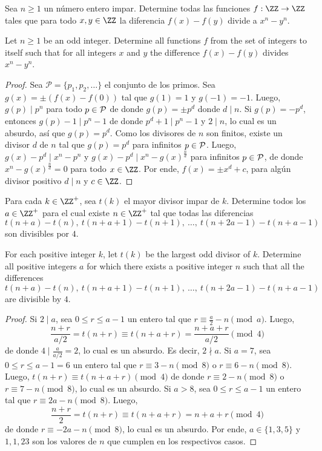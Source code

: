 
\begin{probEB}[ISL 2011/N3]
  Sea $n\ge 1$ un número entero impar. Determine todas las funciones
  $f:\ZZ\to\ZZ$ tales que para todo $x,y\in\ZZ$ la diferencia $f(x)-f(y)$ divide
  a $x^n-y^n$.
  \begin{hint}
    Let $n\ge 1$ be an odd integer. Determine all functions $f$ from the set of
    integers to itself such that for all integers $x$ and $y$ the difference
    $f(x)-f(y)$ divides $x^n-y^n$.
  \end{hint}
\end{probEB}

\begin{proof}
  Sea $\mathcal P=\{p_1,p_2,\dots\}$ el conjunto de los primos. Sea
  $g(x)=\pm(f(x)-f(0))$ tal que $g(1)=1$ y $g(-1)=-1$. Luego, $g(p)\mid p^n$
  para todo $p\in\cal P$ de donde $g(p)=\pm p^d$ donde $d\mid n$. Si
  $g(p)=-p^d$, entonces $g(p)-1\mid p^n-1$ de donde $p^d+1\mid p^n-1$ y
  $2\mid n$, lo cual es un absurdo, así que $g(p)=p^d$. Como los divisores de
  $n$ son finitos, existe un divisor $d$ de $n$ tal que $g(p)=p^d$ para
  infinitos $p\in\cal P$. Luego, $g(x)-p^d\mid x^n-p^n$ y
  $g(x)-p^d\mid x^n-g(x)^\frac{n}{d}$ para infinitos $p\in\cal P$, de donde
  $x^n-g(x)^\frac{n}{d}=0$ para todo $x\in\ZZ$. Por ende, $f(x)=\pm x^d+c$, para
  algún divisor positivo $d\mid n$ y $c\in\ZZ$.
\end{proof}

\begin{probMB}[ISL 2011/N4]
  Para cada $k\in\ZZ^+$, sea $t(k)$ el mayor divisor impar de $k$. Determine
  todos los $a\in\ZZ^+$ para el cual existe $n\in\ZZ^+$ tal que todas las
  diferencias
  \[t(n+a)-t(n),\ t(n+a+1)-t(n+1),\ \dots,\ t(n+2a-1)-t(n+a-1)\]
  son divisibles por $4$.
  \begin{hint}
    For each positive integer $k$, let $t(k)$ be the largest odd divisor of $k$.
    Determine all positive integers $a$ for which there exists a positive
    integer $n$ such that all the differences
    \[t(n+a)-t(n),\ t(n+a+1)-t(n+1),\ \dots,\ t(n+2a-1)-t(n+a-1)\]
    are divisible by $4$.
  \end{hint}
\end{probMB}

\begin{proof}
  Si $2\mid a$, sea $0\le r\le a-1$ un entero tal que
  $r\equiv\frac a2-n\pmod a$. Luego,
  \[\frac{n+r}{a/2}=t(n+r)\equiv t(n+a+r)=\frac{n+a+r}{a/2}\pmod 4\]
  de donde $4\mid\frac{a}{a/2}=2$, lo cual es un absurdo. Es decir, $2\nmid a$.
  Si $a=7$, sea $0\le r\le a-1=6$ un entero tal que $r\equiv 3-n\pmod 8$ o
  $r\equiv 6-n\pmod 8$. Luego, $t(n+r)\equiv t(n+a+r)\pmod 4$ de donde
  $r\equiv 2-n\pmod 8$ o $r\equiv 7-n\pmod 8$, lo cual es un absurdo. Si $a>8$,
  sea $0\le r\le a-1$ un entero tal que $r\equiv 2a-n\pmod 8$. Luego,
  \[\frac{n+r}{2}=t(n+r)\equiv t(n+a+r)=n+a+r\pmod 4\]
  de donde $r\equiv -2a-n\pmod 8$, lo cual es un absurdo. Por ende,
  $a\in\{1,3,5\}$ y $1,1,23$ son los valores de $n$ que cumplen en los
  respectivos casos.
\end{proof}

